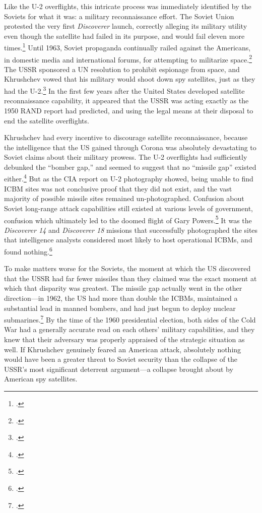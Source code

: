 \documentclass[14pt]{extarticle}
\begin{document}
Like the U-2 overflights, this intricate process was immediately identified by the Soviets for what it was: a military reconnaissance effort. The Soviet Union protested the very first \emph{Discoverer} launch, correctly alleging its military utility even though the satellite had failed in its purpose, and would fail eleven more times.\footcite[p.~140]{day_eye_2015} Until 1963, Soviet propaganda continually railed against the Americans, in domestic media and international forums, for attempting to militarize space.\footcite[p.~271]{mcdougall_heavens_1985} The USSR sponsored a UN resolution to prohibit espionage from space, and Khrushchev vowed that his military would shoot down spy satellites, just as they had the U-2.\footcite[p.~166]{day_eye_2015} In the first few years after the United States developed satellite reconnaissance capability, it appeared that the USSR was acting exactly as the 1950 RAND report had predicted, and using the legal means at their disposal to end the satellite overflights.

Khrushchev had every incentive to discourage satellite reconnaissance, because the intelligence that the US gained through Corona was absolutely devastating to Soviet claims about their military prowess. The U-2 overflights had sufficiently debunked the ``bomber gap,'' and seemed to suggest that no ``missile gap'' existed either.\footcite{goodpaster_cold_2003} But as the CIA report on U-2 photography showed, being unable to find ICBM sites was not conclusive proof that they did not exist, and the vast majority of possible missile sites remained un-photographed. Confusion about Soviet long-range attack capabilities still existed at various levels of government, confusion which ultimately led to the doomed flight of Gary Powers.\footcite[p.~344]{brugioni_eyes_2010} It was the \emph{Discoverer 14} and \emph{Discoverer 18} missions that successfully photographed the sites that intelligence analysts considered most likely to host operational ICBMs, and found nothing.\footcite[p.~379]{brugioni_eyes_2010}

To make matters worse for the Soviets, the moment at which the US discovered that the USSR had far fewer missiles than they claimed was the exact moment at which that disparity was greatest. The missile gap actually went in the other direction---in 1962, the US had more than double the ICBMs, maintained a substantial lead in manned bombers, and had just begun to deploy nuclear submarines.\footcite[p.~251]{mcdougall_heavens_1985} By the time of the 1960 presidential election, both sides of the Cold War had a generally accurate read on each others' military capabilities, and they knew that their adversary was properly appraised of the strategic situation as well.  If Khrushchev genuinely feared an American attack, absolutely nothing would have been a greater threat to Soviet security than the collapse of the USSR's most significant deterrent argument---a collapse brought about by American spy satellites.
\end{document}
